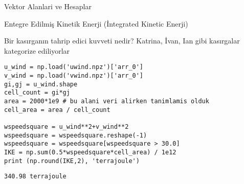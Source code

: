 \documentclass[12pt,fleqn]{article}\usepackage{../../common}
\begin{document}
Vektor Alanlari ve Hesaplar

Entegre Edilmiş Kinetik Enerji (İntegrated Kinetic Enerji)

Bir kasırganın tahrip edici kuvveti nedir? Katrina, İvan, Ian gibi kasırgalar
kategorize ediliyorlar

\begin{verbatim}
u_wind = np.load('uwind.npz')['arr_0']
v_wind = np.load('vwind.npz')['arr_0']
gi,gj = u_wind.shape
cell_count = gi*gj
area = 2000*1e9 # bu alani veri alirken tanimlamis olduk
cell_area = area / cell_count

wspeedsquare = u_wind**2+v_wind**2
wspeedsquare = wspeedsquare.reshape(-1)
wspeedsquare = wspeedsquare[wspeedsquare > 30.0]
IKE = np.sum(0.5*wspeedsquare*cell_area) / 1e12
print (np.round(IKE,2), 'terrajoule')
\end{verbatim}

\begin{verbatim}
340.98 terrajoule
\end{verbatim}
\end{document}
